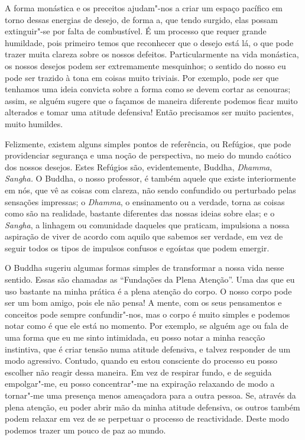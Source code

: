 A forma monástica e os preceitos ajudam"-nos a criar um espaço pacífico
em torno dessas energias de desejo, de forma a, que tendo surgido, elas
possam extinguir"-se por falta de combustível. É um processo que requer
grande humildade, pois primeiro temos que reconhecer que o desejo está
lá, o que pode trazer muita clareza sobre os nossos defeitos.
Particularmente na vida monástica, os nossos desejos podem ser
extremamente mesquinhos; o sentido do nosso eu pode ser trazido à tona
em coisas muito triviais. Por exemplo, pode ser que tenhamos uma ideia
convicta sobre a forma como se devem cortar as cenouras; assim, se
alguém sugere que o façamos de maneira diferente podemos ficar muito
alterados e tomar uma atitude defensiva! Então precisamos ser muito
pacientes, muito humildes.

Felizmente, existem alguns simples pontos de referência, ou Refúgios,
que pode providenciar segurança e uma noção de perspectiva, no meio do
mundo caótico dos nossos desejos. Estes Refúgios são, evidentemente,
Buddha, \emph{Dhamma}, \emph{Sangha.} O Buddha, o nosso professor, é
também aquele que existe interiormente em nós, que vê as coisas com
clareza, não sendo confundido ou perturbado pelas sensações impressas; o
\emph{Dhamma}, o ensinamento ou a verdade, torna as coisas como são na
realidade, bastante diferentes das nossas ideias sobre elas; e o
\emph{Sangha}, a linhagem ou comunidade daqueles que praticam,
impulsiona a nossa aspiração de viver de acordo com aquilo que sabemos
ser verdade, em vez de seguir todos os tipos de impulsos confusos e
egoístas que podem emergir.

O Buddha sugeriu algumas formas simples de transformar a nossa vida
nesse sentido. Essas são chamadas as ``Fundações da Plena Atenção''. Uma
das que eu uso bastante na minha prática é a plena atenção do corpo. O
nosso corpo pode ser um bom amigo, pois ele não pensa! A mente, com os
seus pensamentos e conceitos pode sempre confundir"-nos, mas o corpo é
muito simples e podemos notar como é que ele está no momento. Por
exemplo, se alguém age ou fala de uma forma que eu me sinto intimidada,
eu posso notar a minha reacção instintiva, que é criar tensão numa
atitude defensiva, e talvez responder de um modo agressivo. Contudo,
quando eu estou consciente do processo eu posso escolher não reagir
dessa maneira. Em vez de respirar fundo, e de seguida empolgar"-me, eu
posso concentrar"-me na expiração relaxando de modo a tornar"-me uma
presença menos ameaçadora para a outra pessoa. Se, através da plena
atenção, eu poder abrir mão da minha atitude defensiva, os outros também
podem relaxar em vez de se perpetuar o processo de reactividade. Deste
modo podemos trazer um pouco de paz ao mundo.

